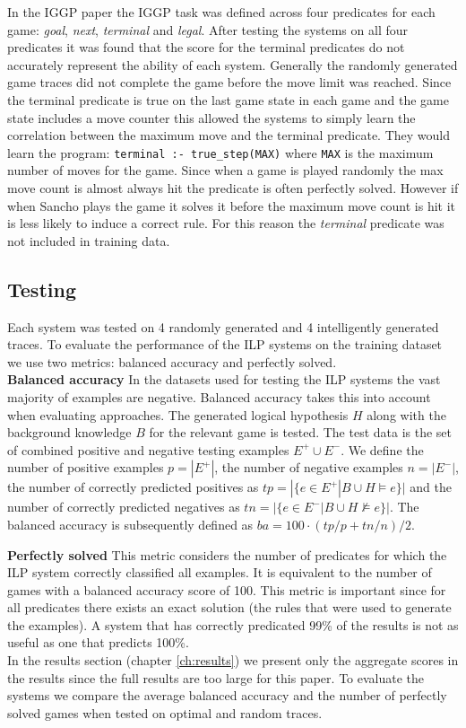 In the IGGP paper \cite{Cropper/IGGP} the IGGP task was defined across four predicates for each game: \textit{goal}, \textit{next}, \textit{terminal} and \textit{legal}. After testing the systems on all four predicates it was found that the score for the terminal predicates do not accurately represent the ability of each system. Generally the randomly generated game traces did not complete the game before the move limit was reached. Since the terminal predicate is true on the last game state in each game and the game state includes a move counter this allowed the systems to simply learn the correlation between the maximum move and the terminal predicate. They would learn the program: \verb|terminal :- true_step(MAX)| where \verb|MAX| is the maximum number of moves for the game. Since when a game is played randomly the max move count is almost always hit the predicate is often perfectly solved. However if when Sancho plays the game it solves it before the maximum move count is hit it is less likely to induce a correct rule. For this reason the \textit{terminal} predicate was not included in training data.

\subsection{Testing}

Each system was tested on 4 randomly generated and 4 intelligently generated traces. To evaluate the performance of the ILP systems on the training dataset we use two metrics: balanced accuracy and perfectly solved.
\\

\textbf{Balanced accuracy} In the datasets used for testing the ILP systems the vast majority of examples are negative. Balanced accuracy takes this into account when evaluating approaches. The generated logical hypothesis $H$ along with the background knowledge $B$ for the relevant game is tested. The test data is the set of combined positive and negative testing examples $E^+ \cup E^-$. We define the number of positive examples $p = |E^+|$, the number of negative examples $n = |E^-|$, the number of correctly predicted positives as $tp = |\{e\in E^+|B\cup H \models e\}|$ and the number of correctly predicted negatives as $tn = |\{e\in E^-|B\cup H \not\models e\}|$. The balanced accuracy is subsequently defined as $ba = 100 \cdot (tp/p + tn/n)/2$.

\textbf{Perfectly solved} This metric considers the number of predicates for which the ILP system correctly classified all examples. It is equivalent to the number of games with a balanced accuracy score of 100. This metric is important since for all predicates there exists an exact solution (the rules that were used to generate the examples). A system that has correctly predicated 99\% of the results is not as useful as one that predicts 100\%.
\\

In the results section (chapter \ref{ch:results}) we present only the aggregate scores in the results since the full results are too large for this paper. To evaluate the systems we compare the average balanced accuracy and the number of perfectly solved games when tested on optimal and random traces.


